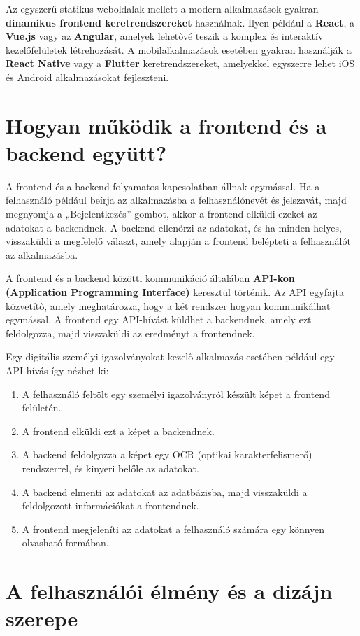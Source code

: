 \documentclass[
]{thesis-ekf}
\theoremstyle{definition}
\theoremstyle{remark}
\begin{document}
	Az egyszerű statikus weboldalak mellett a modern alkalmazások gyakran \textbf{dinamikus frontend keretrendszereket} használnak. Ilyen például a \textbf{React}, a \textbf{Vue.js} vagy az \textbf{Angular}, amelyek lehetővé teszik a komplex és interaktív kezelőfelületek létrehozását. A mobilalkalmazások esetében gyakran használják a \textbf{React Native} vagy a \textbf{Flutter} keretrendszereket, amelyekkel egyszerre lehet iOS és Android alkalmazásokat fejleszteni.
	
	\section{Hogyan működik a frontend és a backend együtt?}
	
	A frontend és a backend folyamatos kapcsolatban állnak egymással. Ha a felhasználó például beírja az alkalmazásba a felhasználónevét és jelszavát, majd megnyomja a „Bejelentkezés” gombot, akkor a frontend elküldi ezeket az adatokat a backendnek. A backend ellenőrzi az adatokat, és ha minden helyes, visszaküldi a megfelelő választ, amely alapján a frontend belépteti a felhasználót az alkalmazásba.
	
	A frontend és a backend közötti kommunikáció általában \textbf{API-kon (Application Programming Interface)} keresztül történik. Az API egyfajta közvetítő, amely meghatározza, hogy a két rendszer hogyan kommunikálhat egymással. A frontend egy API-hívást küldhet a backendnek, amely ezt feldolgozza, majd visszaküldi az eredményt a frontendnek.
	
	Egy digitális személyi igazolványokat kezelő alkalmazás esetében például egy API-hívás így nézhet ki:
	\begin{enumerate}
		\item A felhasználó feltölt egy személyi igazolványról készült képet a frontend felületén.
		\item A frontend elküldi ezt a képet a backendnek.
		\item A backend feldolgozza a képet egy OCR (optikai karakterfelismerő) rendszerrel, és kinyeri belőle az adatokat.
		\item A backend elmenti az adatokat az adatbázisba, majd visszaküldi a feldolgozott információkat a frontendnek.
		\item A frontend megjeleníti az adatokat a felhasználó számára egy könnyen olvasható formában.
	\end{enumerate}
	\section{A felhasználói élmény és a dizájn szerepe}
	
\end{document}
